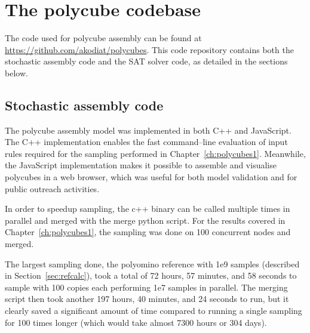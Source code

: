 

\chapter{The polycube codebase}
\label{ch:appendix_polycubes}

\minitoc

The code used for polycube assembly can be found at \url{https://github.com/akodiat/polycubes}. This code repository contains both the stochastic assembly code and the SAT solver code, as detailed in the sections below.

\section{Stochastic assembly code}
The polycube assembly model was implemented in both C++ and JavaScript. The C++ implementation enables the fast command--line evaluation of input rules required for the sampling performed in Chapter~\ref{ch:polycubes1}. Meanwhile, the JavaScript implementation makes it possible to assemble and visualise polycubes in a web browser, which was useful for both model validation and for public outreach activities.

In order to speedup sampling, the c++ binary can be called multiple times in parallel and merged with the merge python script. For the results covered in Chapter~\ref{ch:polycubes1}, the sampling was done on 100 concurrent nodes and merged.

The largest sampling done, the polyomino reference with 1e9 samples (described in Section~\ref{sec:refcalc}), took a total of 72 hours, 57 minutes, and 58 seconds to sample with 100 copies each performing 1e7 samples in parallel. The merging script then took another 197 hours, 40 minutes, and 24 seconds to run, but it clearly saved a significant amount of time compared to running a single sampling for 100 times longer (which would take almost 7300 hours or 304 days).

